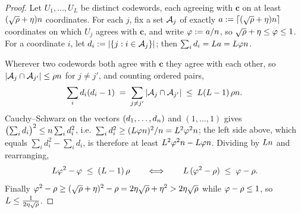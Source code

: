 \begin{proof}
Let $U_1, \dots, U_L$ be distinct codewords, each agreeing with $\mathbf{c}$ on at least $(\sqrt{\rho}+\eta) n$ coordinates. For each $j$, fix a set $\mathcal{A}_j$ of exactly $a := \lceil (\sqrt{\rho}+\eta) n \rceil$ coordinates on which $U_j$ agrees with $\mathbf{c}$, and write $\varphi := a/n$, so $\sqrt{\rho} + \eta \le \varphi \le 1$. For a coordinate $i$, let $d_i := |\{ j : i \in \mathcal{A}_j \}|$; then $\sum_i d_i = L a = L \varphi n$.

Wherever two codewords both agree with $\mathbf{c}$ they agree with each other, so $|\mathcal{A}_j \cap \mathcal{A}_{j'}| \le \rho n$ for $j \neq j'$, and counting ordered pairs,
\[
\sum_i d_i (d_i - 1) \;=\; \sum_{j \neq j'} |\mathcal{A}_j \cap \mathcal{A}_{j'}| \;\le\; L(L-1)\, \rho n .
\]
Cauchy--Schwarz on the vectors $(d_1, \dots, d_n)$ and $(1, \dots, 1)$ gives $\bigl(\sum_i d_i\bigr)^2 \le n \sum_i d_i^2$, i.e.\ $\sum_i d_i^2 \ge (L \varphi n)^2 / n = L^2 \varphi^2 n$; the left side above, which equals $\sum_i d_i^2 - \sum_i d_i$, is therefore at least $L^2 \varphi^2 n - L \varphi n$. Dividing by $Ln$ and rearranging,
\[
L \varphi^2 - \varphi \;\le\; (L-1)\, \rho
\qquad\Longleftrightarrow\qquad
L\, (\varphi^2 - \rho) \;\le\; \varphi - \rho .
\]
Finally $\varphi^2 - \rho \ge (\sqrt{\rho}+\eta)^2 - \rho = 2\eta\sqrt{\rho} + \eta^2 > 2\eta\sqrt{\rho}$ while $\varphi - \rho \le 1$, so $L \le \tfrac{1}{2\eta\sqrt{\rho}}$.
\end{proof}
